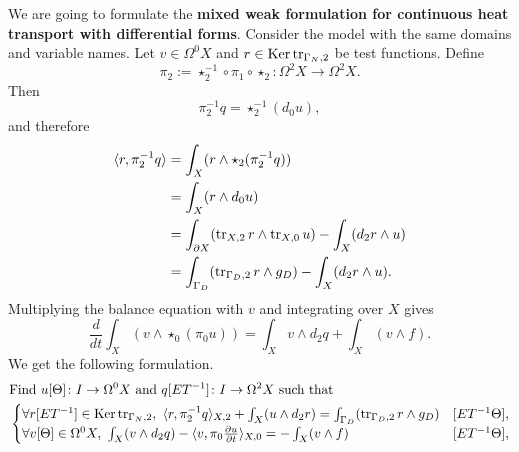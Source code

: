 \begin{discussion}
  We are going to formulate the \textbf{mixed weak formulation for continuous
  heat transport with differential forms}.
  Consider the model
  with the same domains and variable names.
  Let $v \in \Omega^0 X$ and $r \in \mathop{\rm Ker}\nolimits \mathop{\rm tr}\nolimits_{\Gamma_N, 2}$ be test functions.
  Define
  \begin{equation}
    \pi_2 :=
    \star_2^{-1} \circ \pi_1 \circ \star_2 \colon \Omega^2 X \to \Omega^2 X.
  \end{equation}
  Then
  \begin{equation}
    \pi_2^{-1} q = \star_2^{-1} (d_0 u),
  \end{equation}
  and therefore
  \begin{equation}
    \begin{split}
      \langle r,\pi_2^{-1} q\rangle
      & = \int_X (r \wedge \star_2 (\pi_2^{-1} q)) \\
      & = \int_X (r \wedge d_0 u) \\
      & = \int_{\partial X} (\mathop{\rm tr}\nolimits_{X, 2} r \wedge \mathop{\rm tr}\nolimits_{X, 0} u)
        - \int_{X} (d_2 r \wedge u) \\
      & = \int_{\Gamma_D} (\mathop{\rm tr}\nolimits_{\Gamma_D, 2} r \wedge g_D)
        - \int_{X} (d_2 r \wedge u).
    \end{split}
  \end{equation}
  Multiplying the balance equation with $v$ and integrating over $X$ gives
  \begin{equation}
    \frac{d}{d t} \int_X (v \wedge \star_0 (\pi_0 u))
    = \int_X v \wedge d_2 q + \int_X (v \wedge f).
  \end{equation}
  We get the following formulation.
  \begin{equation}
    \begin{split}
      & \text{Find $u [\Theta] \colon I \to \Omega^0 X$ and
        $q [E T^{-1}] \colon I \to \Omega^2 X$ such that} \\
      &
      \begin{cases}
        \forall r [E T^{-1}] \in \mathop{\rm Ker}\nolimits \mathop{\rm tr}\nolimits_{\Gamma_N, 2},\
          \langle r,\pi_2^{-1} q\rangle_{X, 2} + \int_{X} (u \wedge d_2 r)
          = \int_{\Gamma_D} (\mathop{\rm tr}\nolimits_{\Gamma_D, 2} r \wedge g_D)
        & [E T^{-1} \Theta], \\
        \forall v [\Theta] \in \Omega^0 X,\
          \int_X (v \wedge d_2 q)
          - \langle v,\pi_0 \frac{\partial u}{\partial t}\rangle_{X, 0}
          = - \int_X (v \wedge f)
        & [E T^{-1} \Theta], \\

\end{cases}
\end{split}
\end{equation}
\end{discussion}
